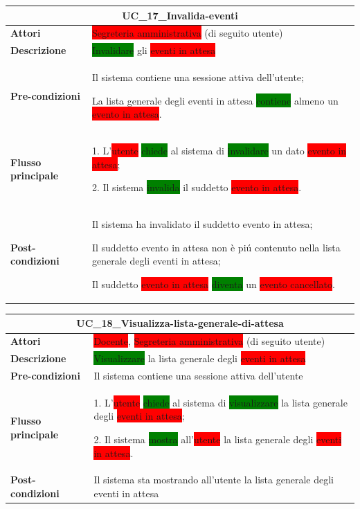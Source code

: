 \documentclass[11pt]{article}
\begin{document}
\begin{table}[H]
\centering
\begin{tabularx}{1\textwidth}{|l|X|}
\hline
\multicolumn{2}{|c|}{\textbf{UC\_17\_Invalida-eventi}}\\
\hline \textbf{Attori} & \colorbox{red}{Segreteria amministrativa} (di seguito utente)\\
\hline \textbf{Descrizione} & \colorbox{green}{Invalidare} gli \colorbox{red}{eventi in attesa}\\
\hline \textbf{Pre-condizioni} & 
Il sistema contiene una sessione attiva dell'utente;

La lista generale degli eventi in attesa \colorbox{green}{contiene} almeno un \colorbox{red}{evento in attesa}.
\\
\hline \textbf{Flusso principale} & 
1. L'\colorbox{red}{utente} \colorbox{green}{chiede} al sistema di \colorbox{green}{invalidare} un dato \colorbox{red}{evento in attesa};

2. Il sistema \colorbox{green}{invalida} il suddetto \colorbox{red}{evento in attesa}.
\\
\hline \textbf{Post-condizioni} & 
Il sistema ha invalidato il suddetto evento in attesa;

Il suddetto evento in attesa non è piú contenuto nella lista generale degli eventi in attesa;

Il suddetto \colorbox{red}{evento in attesa} \colorbox{green}{diventa} un \colorbox{red}{evento cancellato}.
\\
\hline
\end{tabularx}
\end{table}

\begin{table}[H]
\centering
\begin{tabularx}{1\textwidth}{|l|X|}
\hline
\multicolumn{2}{|c|}{\textbf{UC\_18\_Visualizza-lista-generale-di-attesa}}\\
\hline \textbf{Attori} & \colorbox{red}{Docente}, \colorbox{red}{Segreteria amministrativa} (di seguito utente)\\
\hline \textbf{Descrizione} & \colorbox{green}{Visualizzare} la lista generale degli \colorbox{red}{eventi in attesa}\\
\hline \textbf{Pre-condizioni} & Il sistema contiene una sessione attiva dell'utente\\
\hline \textbf{Flusso principale} & 
1. L'\colorbox{red}{utente} \colorbox{green}{chiede} al sistema di \colorbox{green}{visualizzare} la lista generale degli \colorbox{red}{eventi in attesa};

2. Il sistema \colorbox{green}{mostra} all'\colorbox{red}{utente} la lista generale degli \colorbox{red}{eventi in attesa}.\\
\hline \textbf{Post-condizioni} & Il sistema sta mostrando all'utente la lista generale degli eventi in attesa\\
\hline
\end{tabularx}
\end{table}
\end{document}
